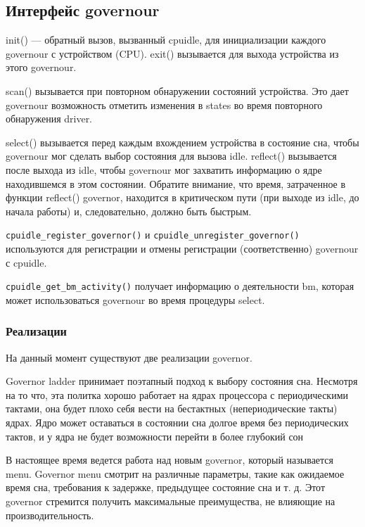 \documentclass{article}
\begin{document}
\subsection{Интерфейс governour}


init() --- обратный вызов, вызванный cpuidle, для инициализации каждого governour с устройством (CPU). exit() вызывается для выхода устройства из этого governour.

scan() вызывается при повторном обнаружении состояний устройства. Это дает governour возможность отметить изменения в states во время повторного обнаружения driver.

select() вызывается перед каждым вхождением устройства в состояние сна, чтобы governour мог сделать выбор состояния для вызова idle. reflect() вызывается после выхода из idle, чтобы governour мог захватить информацию о ядре находившемся в этом состоянии. Обратите внимание, что время, затраченное в функции reflect() governor, находится в критическом пути (при выходе из idle, до начала работы) и, следовательно, должно быть быстрым.

\texttt{cpuidle\_register\_governor()}  и \texttt{cpuidle\_unregister\_governor()} используются для регистрации и отмены регистрации (соответственно) governour с cpuidle.

\texttt{cpuidle\_get\_bm\_activity()} получает информацию о деятельности bm, которая может использоваться governour во время процедуры select.

\subsubsection{Реализации}

На данный момент существуют две реализации governor.

Governor ladder принимает поэтапный подход к выбору состояния сна. Несмотря на то что, эта политка хорошо работает на ядрах процессора с периодическими тактами, она будет плохо себя вести на бестактных (непериодические такты) ядрах. Ядро может оставаться в состоянии сна долгое время без периодических тактов, и у ядра не будет возможности перейти в более глубокий сон

В настоящее время ведется работа над новым governor, который называется menu. Governor menu смотрит на различные параметры, такие как ожидаемое время сна, требования к задержке, предыдущее состояние сна и т. д. Этот governor стремится получить максимальные преимущества, не влияющие на производительность.
\end{document}
